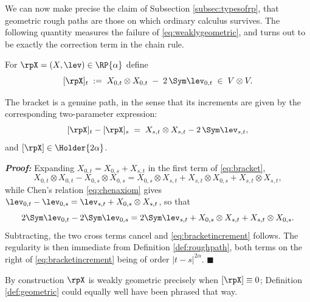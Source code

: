 \begin{remark}\label{rem:integraldepends}

We can now make precise the claim of Subsection \ref{subsec:typesofrp}, that geometric rough paths
are those on which ordinary calculus survives. The following quantity measures the failure of
\eqref{eq:weaklygeometric}, and turns out to be exactly the correction term in the chain rule.

\end{remark}

\begin{definition}\label{def:bracket}
For $\rpX = (X,\lev) \in \RP{\alpha}$ define
\begin{equation}\label{eq:bracket}
[\rpX]_t \;:=\; X_{0,t}\otimes X_{0,t} \;-\; 2\,\Sym\lev_{0,t} \;\in\; V\otimes V .
\end{equation}
\end{definition}

\begin{lemma}\label{lem:bracketincrement}
The bracket is a genuine path, in the sense that its increments are given by the corresponding
two-parameter expression:
\begin{equation}\label{eq:bracketincrement}
[\rpX]_t - [\rpX]_s \;=\; X_{s,t}\otimes X_{s,t} - 2\,\Sym\lev_{s,t} ,
\end{equation}
and $[\rpX] \in \Holder{2\alpha}$.
\end{lemma}

\textbf{\textit{Proof:}} Expanding $X_{0,t} = X_{0,s}+X_{s,t}$ in the first term of
\eqref{eq:bracket},
\[
X_{0,t}\otimes X_{0,t} - X_{0,s}\otimes X_{0,s}
= X_{0,s}\otimes X_{s,t} + X_{s,t}\otimes X_{0,s} + X_{s,t}\otimes X_{s,t},
\]
while Chen's relation \eqref{eq:chenaxiom} gives
$\lev_{0,t}-\lev_{0,s} = \lev_{s,t} + X_{0,s}\otimes X_{s,t}$, so that
\[
2\Sym\lev_{0,t} - 2\Sym\lev_{0,s} = 2\Sym\lev_{s,t} + X_{0,s}\otimes X_{s,t} + X_{s,t}\otimes X_{0,s}.
\]
Subtracting, the two cross terms cancel and \eqref{eq:bracketincrement} follows. The regularity is
then immediate from Definition \ref{def:roughpath}, both terms on the right of
\eqref{eq:bracketincrement} being of order $|t-s|^{2\alpha}$. \hfill $\blacksquare$

\medskip

By construction $\rpX$ is weakly geometric precisely when $[\rpX] \equiv 0$; Definition
\ref{def:geometric} could equally well have been phrased that way.

